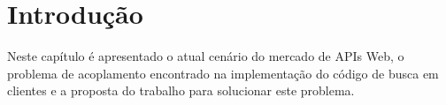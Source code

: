 \chapter{Introdução}

Neste capítulo é apresentado o atual cenário do mercado de APIs Web, o problema de acoplamento encontrado na implementação do código de busca em clientes e a proposta do trabalho para solucionar este problema.





